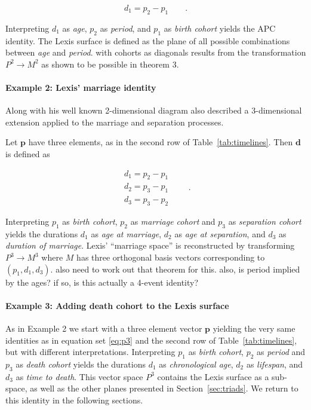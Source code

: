 \documentclass[12pt,oneside,a4paper]{article} %
\newcommand\vt[1]{\textcolor{rd}{#1}}
\begin{document}
\begin{equation}
d_1 = p_2 - p_1   \quad\quad.
\end{equation}

Interpreting $d_1$ as \textit{age}, $p_2$ as \textit{period}, and $p_1$ as
\textit{birth cohort} yields the APC identity. The Lexis surface is defined as the plane of
all possible combinations between \textit{age} and \textit{period}.
\vt{with cohorts as diagonals results from the transformation $P^2 \rightarrow
M^2$ as shown to be possible in theorem 3.}


\paragraph{Example 2: Lexis' marriage identity}

Along with his well known 2-dimensional diagram \citet{lexis1875einleitung} also
described a 3-dimensional extension applied to the marriage and
separation processes.

Let $\textbf{p}$ have three elements, as in the second row of
Table~\ref{tab:timelines}. Then $\textbf{d}$ is defined as

\begin{equation}
\label{eq:p3}
\begin{matrix}
d_1 = p_2 - p_1\\
d_2 = p_3 - p_1\\
d_3 = p_3 - p_2
\end{matrix} \quad\quad.
\end{equation}

Interpreting $p_1$ as \textit{birth cohort}, $p_2$ as \textit{marriage cohort} and $p_3$ as
 \textit{separation cohort} yields the durations $d_1$ as \textit{age at
 marriage}, $d_2$ as \textit{age at separation}, and $d_3$ as \textit{duration
 of marriage}. Lexis' ``marriage space'' is reconstructed by transforming $P^3
 \rightarrow M^3$ where $M$ has three orthogonal basis vectors corresponding to
 $(p_1, d_1, d_3)$. \vt{also need to work out that theorem for this.} \vt{also,
 is period implied by the ages? if so, is this actually a 4-event identity?}

\paragraph{Example 3: Adding death cohort to the Lexis surface}

As in Example 2 we start with a three element vector
$\textbf{p}$ yielding the very same identities as in equation set
\eqref{eq:p3} and the second row of Table~\ref{tab:timelines}, but with different interpretations.
Interpreting $p_1$ as \textit{birth cohort}, $p_2$ as \textit{period} and $p_3$ as \textit{death cohort} yields the durations $d_1$ as \textit{chronological age},
$d_2$ as \textit{lifespan}, and $d_3$ as \textit{time to death}. This
vector space $P^3$ contains the Lexis surface as a sub-space, as well as the
other planes presented in Section~\ref{sec:triads}. We return to this identity
in the following sections.
\end{document}
